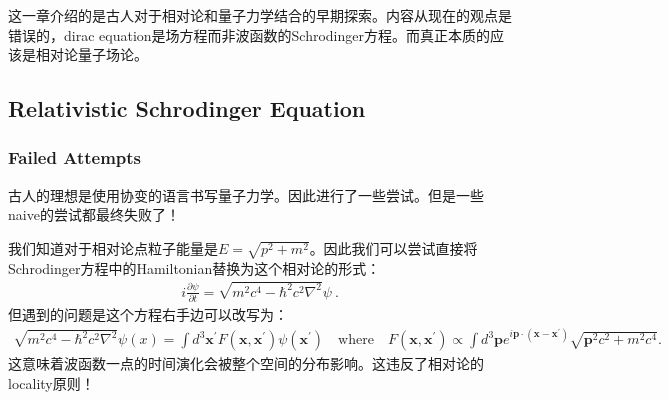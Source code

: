 这一章介绍的是古人对于相对论和量子力学结合的早期探索。内容从现在的观点是错误的，dirac
equation是场方程而非波函数的Schrodinger方程。而真正本质的应该是相对论量子场论。

\subsection{Relativistic Schrodinger Equation}

\subsubsection{Failed Attempts}
古人的理想是使用协变的语言书写量子力学。因此进行了一些尝试。但是一些naive的尝试都最终失败了！

\bigskip
{}

我们知道对于相对论点粒子能量是$ E=\sqrt{p^2+m^2}
$。因此我们可以尝试直接将Schrodinger方程中的Hamiltonian替换为这个相对论的形式：
\begin{align}
  i\frac{\partial\psi}{\partial
  t}=\sqrt{m^2c^4-\hbar^2c^2\nabla^2}\psi\mathrm{~.}
\end{align}
但遇到的问题是这个方程右手边可以改写为：
\begin{align}
  \sqrt{m^2c^4-\hbar^2c^2\nabla^2}\psi(x)=\int
  d^3\mathbf{x}^{\prime}F(\mathbf{x},\mathbf{x}^{\prime})\psi(\mathbf{x}^{\prime})
  \quad \text{where} \quad
  F(\mathbf{x},\mathbf{x}^{\prime})\propto\int
  d^3\mathbf{p}e^{i\mathbf{p}\cdot(\mathbf{x}-\mathbf{x}^{\prime})}\sqrt{\mathbf{p}^2c^2+m^2c^4}.
\end{align}
这意味着波函数一点的时间演化会被整个空间的分布影响。这违反了相对论的locality原则！

\bigskip
{}

